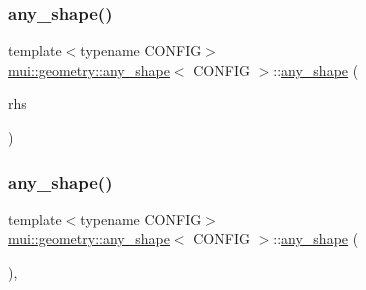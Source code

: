 \mbox{\label{classmui_1_1geometry_1_1any__shape_a4992baf3b21a4e5ab73db0d7131d4cf7}} 
\subsubsection{\texorpdfstring{any\+\_\+shape()}{any\_shape()}\hspace{0.1cm}{\footnotesize\ttfamily [2/4]}}
{\footnotesize\ttfamily template$<$typename C\+O\+N\+F\+IG$>$ \\
\hyperlink{classmui_1_1geometry_1_1any__shape}{mui\+::geometry\+::any\+\_\+shape}$<$ C\+O\+N\+F\+IG $>$\+::\hyperlink{classmui_1_1geometry_1_1any__shape}{any\+\_\+shape} (\begin{DoxyParamCaption}\item[{const \hyperlink{classmui_1_1geometry_1_1any__shape}{any\+\_\+shape}$<$ C\+O\+N\+F\+IG $>$ \&}]{rhs }\end{DoxyParamCaption})\hspace{0.3cm}{\ttfamily [inline]}}

\mbox{\label{classmui_1_1geometry_1_1any__shape_af9f12f87e8eb84b835392a6e03b3b9b0}} 
\subsubsection{\texorpdfstring{any\+\_\+shape()}{any\_shape()}\hspace{0.1cm}{\footnotesize\ttfamily [3/4]}}
{\footnotesize\ttfamily template$<$typename C\+O\+N\+F\+IG$>$ \\
\hyperlink{classmui_1_1geometry_1_1any__shape}{mui\+::geometry\+::any\+\_\+shape}$<$ C\+O\+N\+F\+IG $>$\+::\hyperlink{classmui_1_1geometry_1_1any__shape}{any\+\_\+shape} (\begin{DoxyParamCaption}\item[{\hyperlink{classmui_1_1geometry_1_1any__shape}{any\+\_\+shape}$<$ C\+O\+N\+F\+IG $>$ \&\&}]{ }\end{DoxyParamCaption})\hspace{0.3cm}{\ttfamily [default]}, {\ttfamily [noexcept]}}

